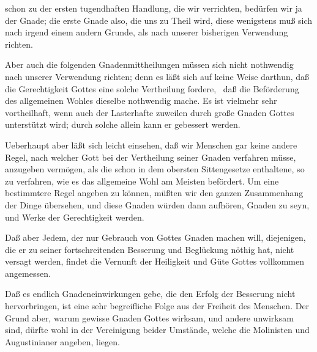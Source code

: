 \begin{aufza}
\begin{aufzb}
\item schon zu der ersten tugendhaften Handlung, die wir verrichten, bedürfen wir ja der Gnade; die erste Gnade also, die uns zu Theil wird, diese wenigstens muß sich nach irgend einem andern Grunde, als nach unserer bisherigen Verwendung richten.
\item Aber auch die folgenden Gnadenmittheilungen müssen sich nicht nothwendig nach unserer Verwendung richten; denn es läßt sich auf keine Weise darthun, daß die Gerechtigkeit Gottes eine solche Vertheilung fordere, \dh\ daß die Beförderung des allgemeinen Wohles dieselbe nothwendig mache. Es ist vielmehr sehr vortheilhaft, wenn auch der Lasterhafte zuweilen durch große Gnaden Gottes unterstützt wird; durch solche allein kann er gebessert werden.
\item Ueberhaupt aber läßt sich leicht einsehen, daß wir Menschen gar keine andere Regel, nach welcher Gott bei der Vertheilung seiner Gnaden verfahren müsse, anzugeben vermögen, als die schon in dem obersten Sittengesetze enthaltene, so zu verfahren, wie es das allgemeine Wohl am Meisten befördert. Um eine bestimmtere Regel angeben zu können, müßten wir den ganzen Zusammenhang der Dinge übersehen, und diese Gnaden würden dann aufhören, Gnaden zu seyn, und Werke der Gerechtigkeit werden.
\end{aufzb}
\item Daß aber Jedem, der nur Gebrauch von Gottes Gnaden machen will, diejenigen, die er zu seiner fortschreitenden Besserung und Beglückung nöthig hat, nicht versagt werden, findet die Vernunft der Heiligkeit und Güte Gottes vollkommen angemessen.
\item Daß es endlich Gnadeneinwirkungen gebe, die den Erfolg der Besserung nicht hervorbringen, ist eine sehr begreifliche Folge aus der Freiheit des Menschen. Der Grund aber, warum gewisse Gnaden Gottes wirksam, und andere unwirksam sind, dürfte wohl in der Vereinigung beider Umstände, welche die Molinisten und Augustinianer angeben, liegen.
\end{aufza}

